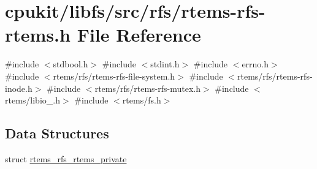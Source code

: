 \hypertarget{rtems-rfs-rtems_8h}{}\section{cpukit/libfs/src/rfs/rtems-\/rfs-\/rtems.h File Reference}
\label{rtems-rfs-rtems_8h}
{\ttfamily \#include $<$stdbool.\+h$>$}\newline
{\ttfamily \#include $<$stdint.\+h$>$}\newline
{\ttfamily \#include $<$errno.\+h$>$}\newline
{\ttfamily \#include $<$rtems/rfs/rtems-\/rfs-\/file-\/system.\+h$>$}\newline
{\ttfamily \#include $<$rtems/rfs/rtems-\/rfs-\/inode.\+h$>$}\newline
{\ttfamily \#include $<$rtems/rfs/rtems-\/rfs-\/mutex.\+h$>$}\newline
{\ttfamily \#include $<$rtems/libio\+\_\+.\+h$>$}\newline
{\ttfamily \#include $<$rtems/fs.\+h$>$}\newline
\subsection*{Data Structures}
\begin{DoxyCompactItemize}
\item 
struct \mbox{\hyperlink{structrtems__rfs__rtems__private}{rtems\+\_\+rfs\+\_\+rtems\+\_\+private}}
\end{DoxyCompactItemize}
